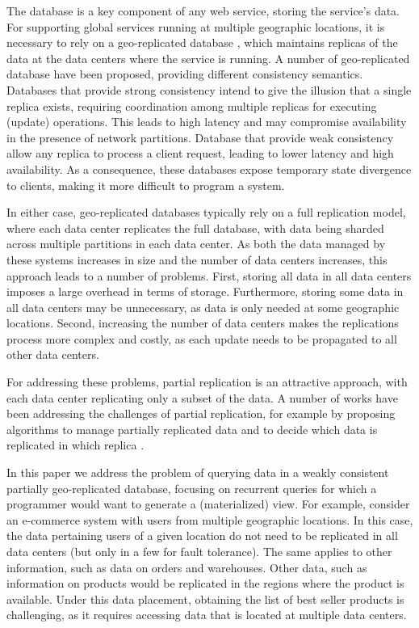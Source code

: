 \documentclass{vldb}
\begin{document}

The database is a key component of any web service, storing the service's data. For supporting global
services running at multiple geographic locations, it is necessary to rely on a geo-replicated database \cite{dynamo},
which maintains replicas of the data at the data centers where the service is running.
A number of geo-replicated database have been proposed, providing different consistency semantics.
Databases that provide strong consistency \cite{spanner,cockroachdb,mdcc} intend to give  the illusion that 
a single replica exists, requiring coordination among
multiple replicas for executing (update) operations. This leads to high latency and may compromise 
availability in the presence of network partitions.
Database that provide weak consistency \cite{eventual,dynamo,cops} allow any replica to process a
client request, leading to lower latency and high availability. As a consequence, these databases expose
temporary state divergence to clients, making it more difficult to program a system. 

In either case, geo-replicated databases typically rely on a full replication model, where each data 
center replicates the full database, with data being sharded across multiple partitions in each data 
center. 
As both the data managed by these systems increases in size and the number of data centers increases,
this approach leads to a number of problems.
First, storing all data in all data centers imposes a large overhead in terms of storage. 
Furthermore, storing some data in all data centers may be unnecessary, as data is only needed at some
geographic locations.
Second, increasing the number of data centers makes the replications process more complex and costly, 
as each update needs to be propagated to all other data centers.

For addressing these problems, partial replication is an attractive approach, with each data center
replicating only a subset of the data. A number of works have been addressing the challenges of 
partial replication, for example by proposing algorithms to manage partially replicated data \cite{more,saturn,c3}
and to decide which data is replicated in which replica \cite{}.

In this paper we address the problem of querying data in a weakly consistent partially geo-replicated database, 
focusing on recurrent queries for which a programmer would want to generate a (materialized) view.
For example, consider an e-commerce system with users from multiple geographic locations.
In this case, the data pertaining users of a given location do not need to be replicated in all data centers
(but only in a few for fault tolerance). The same applies to other information, such as data on orders and 
warehouses.
Other data, such as information on products would be replicated in the regions where the product
is available.  
Under this data placement, obtaining the list of best seller products is challenging, as it requires
accessing data that is located at multiple data centers.
\end{document}
